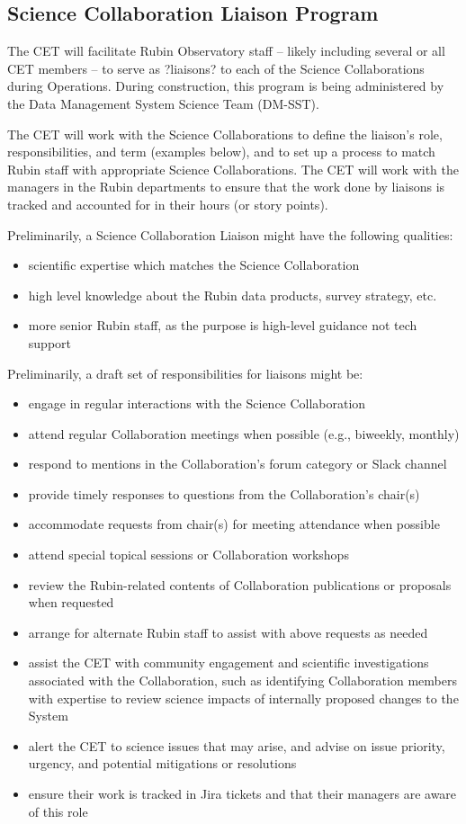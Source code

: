 \documentclass[DM,lsstdraft,toc]{lsstdoc}
\begin{document}
\subsection{Science Collaboration Liaison Program}\label{ssec:mod_liaisons}

The CET will facilitate Rubin Observatory staff -- likely including several or all CET members -- to serve as ?liaisons? to each of the Science Collaborations during Operations. 
During construction, this program is being administered by the Data Management System Science Team (DM-SST).

The CET will work with the Science Collaborations to define the liaison's role, responsibilities, and term (examples below), and to set up a process to match Rubin staff with appropriate Science Collaborations.
The CET will work with the managers in the Rubin departments to ensure that the work done by liaisons is tracked and accounted for in their hours (or story points). 

Preliminarily, a Science Collaboration Liaison might have the following qualities:
\begin{itemize}
\item scientific expertise which matches the Science Collaboration
\item high level knowledge about the Rubin data products, survey strategy, etc. 
\item more senior Rubin staff, as the purpose is high-level guidance not tech support
\end{itemize}

Preliminarily, a draft set of responsibilities for liaisons might be:
\begin{itemize}
\item engage in regular interactions with the Science Collaboration
\item attend regular Collaboration meetings when possible (e.g., biweekly, monthly)
\item respond to mentions in the Collaboration's forum category or Slack channel
\item provide timely responses to questions from the Collaboration's chair(s)
\item accommodate requests from chair(s) for meeting attendance when possible
\item attend special topical sessions or Collaboration workshops
\item review the Rubin-related contents of Collaboration publications or proposals when requested
\item arrange for alternate Rubin staff to assist with above requests as needed
\item assist the CET with community engagement and scientific investigations associated with the Collaboration, such as identifying Collaboration members with expertise to review science impacts of internally proposed changes to the System
\item alert the CET to science issues that may arise, and advise on issue priority, urgency, and potential mitigations or resolutions
\item ensure their work is tracked in Jira tickets and that their managers are aware of this role
\end{itemize}
\end{document}
